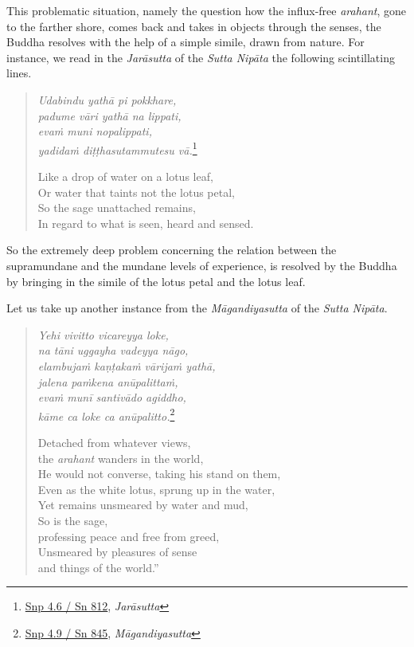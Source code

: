 This problematic situation, namely the question how the influx-free \emph{arahant}, gone to the farther shore, comes back and takes in objects through the senses, the Buddha resolves with the help of a simple simile, drawn from nature. For instance, we read in the \emph{Jarāsutta} of the \emph{Sutta Nipāta} the following scintillating lines.

\begin{quote}
\emph{Udabindu yathā pi pokkhare,}\\
\emph{padume vāri yathā na lippati,}\\
\emph{evaṁ muni nopalippati,}\\
\emph{yadidaṁ diṭṭhasutammutesu vā.}\footnote{\href{https://suttacentral.net/snp4.6/pli/ms}{Snp 4.6 / Sn 812}, \emph{Jarāsutta}}

Like a drop of water on a lotus leaf,\\
Or water that taints not the lotus petal,\\
So the sage unattached remains,\\
In regard to what is seen, heard and sensed.
\end{quote}

So the extremely deep problem concerning the relation between the supramundane and the mundane levels of experience, is resolved by the Buddha by bringing in the simile of the lotus petal and the lotus leaf.

Let us take up another instance from the \emph{Māgandiyasutta} of the \emph{Sutta Nipāta}.

\begin{quote}
\emph{Yehi vivitto vicareyya loke,}\\
\emph{na tāni uggayha vadeyya nāgo,}\\
\emph{elambujaṁ kaṇṭakaṁ vārijaṁ yathā,}\\
\emph{jalena paṁkena anūpalittaṁ,}\\
\emph{evaṁ munī santivādo agiddho,}\\
\emph{kāme ca loke ca anūpalitto.}\footnote{\href{https://suttacentral.net/snp4.9/pli/ms}{Snp 4.9 / Sn 845}, \emph{Māgandiyasutta}}

Detached from whatever views,\\
\vin the \emph{arahant} wanders in the world,\\
He would not converse, taking his stand on them,\\
Even as the white lotus, sprung up in the water,\\
Yet remains unsmeared by water and mud,\\
So is the sage,\\
\vin professing peace and free from greed,\\
Unsmeared by pleasures of sense\\
\vin and things of the world.''
\end{quote}

